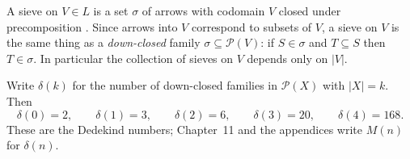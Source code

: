 \begin{definition}\label{ch07:def-sieve-poset}
A sieve on $V\in L$ is a set $\sigma$ of arrows with codomain $V$ closed under precomposition \cite{maclane, johnstone}. Since arrows into $V$ correspond to subsets of $V$, a sieve on $V$ is the same thing as a \emph{down-closed} family $\sigma\subseteq\mathcal{P}(V)$: if $S\in\sigma$ and $T\subseteq S$ then $T\in\sigma$. In particular the collection of sieves on $V$ depends only on $|V|$.
\end{definition}

\begin{lemma}\label{ch07:lem-downsets}
Write $\delta(k)$ for the number of down-closed families in $\mathcal{P}(X)$ with $|X|=k$. Then
\[
\delta(0)=2,\qquad \delta(1)=3,\qquad \delta(2)=6,\qquad \delta(3)=20,\qquad \delta(4)=168 .
\]
These are the Dedekind numbers; Chapter~11 and the appendices write $M(n)$ for $\delta(n)$.
\end{lemma}

